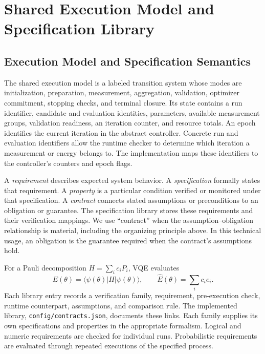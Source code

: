 \documentclass[conference]{IEEEtran}
\newcommand{\Ehat}{\widehat E}
\begin{document}
\section{Shared Execution Model and Specification Library}
\label{sec:model}
\subsection{Execution Model and Specification Semantics}
The shared execution model is a labeled transition system whose modes are initialization, preparation, measurement, aggregation, validation, optimizer commitment, stopping checks, and terminal closure. Its state contains a run identifier, candidate and evaluation identities, parameters, available measurement groups, validation readiness, an iteration counter, and resource totals. An epoch identifies the current iteration in the abstract controller. Concrete run and evaluation identifiers allow the runtime checker to determine which iteration a measurement or energy belongs to. The implementation maps these identifiers to the controller's counters and epoch flags.

A \emph{requirement} describes expected system behavior. A \emph{specification} formally states that requirement. A \emph{property} is a particular condition verified or monitored under that specification. A \emph{contract} connects stated assumptions or preconditions to an obligation or guarantee. The specification library stores these requirements and their verification mappings. We use ``contract'' when the assumption--obligation relationship is material, including the organizing principle above. In this technical usage, an obligation is the guarantee required when the contract's assumptions hold.

For a Pauli decomposition $H=\sum_i c_iP_i$, VQE evaluates
\begin{equation}
 E(\theta)=\langle\psi(\theta)|H|\psi(\theta)\rangle,
 \qquad \Ehat(\theta)=\sum_i c_i\hat e_i.
 \label{eq:energy}
\end{equation}
Each library entry records a verification family, requirement, pre-execution check, runtime counterpart, assumptions, and comparison rule. The implemented library, \texttt{config/contracts.json}, documents these links. Each family supplies its own specifications and properties in the appropriate formalism. Logical and numeric requirements are checked for individual runs. Probabilistic requirements are evaluated through repeated executions of the specified process.
\end{document}
